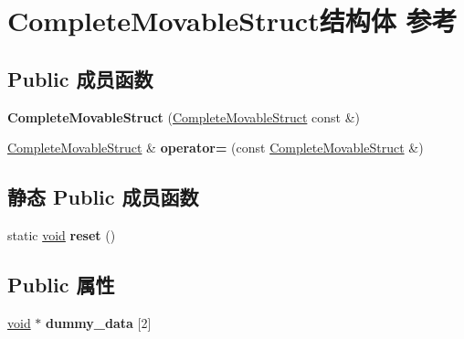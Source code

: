 \hypertarget{struct_complete_movable_struct}{}\section{Complete\+Movable\+Struct结构体 参考}
\label{struct_complete_movable_struct}
\subsection*{Public 成员函数}
\begin{DoxyCompactItemize}
\item 
\mbox{\label{struct_complete_movable_struct_a465ecf80fa25038c7a18110aec8fee29}} 
{\bfseries Complete\+Movable\+Struct} (\hyperlink{struct_complete_movable_struct}{Complete\+Movable\+Struct} const \&)
\item 
\mbox{\label{struct_complete_movable_struct_a7ca0f75057f541d894f9241ab9b9c1d7}} 
\hyperlink{struct_complete_movable_struct}{Complete\+Movable\+Struct} \& {\bfseries operator=} (const \hyperlink{struct_complete_movable_struct}{Complete\+Movable\+Struct} \&)
\end{DoxyCompactItemize}
\subsection*{静态 Public 成员函数}
\begin{DoxyCompactItemize}
\item 
\mbox{\label{struct_complete_movable_struct_a380874d9ac22d2fba24b13d43a73c96f}} 
static \hyperlink{interfacevoid}{void} {\bfseries reset} ()
\end{DoxyCompactItemize}
\subsection*{Public 属性}
\begin{DoxyCompactItemize}
\item 
\mbox{\label{struct_complete_movable_struct_a0dfb1197288f200054d56a4784b2476a}} 
\hyperlink{interfacevoid}{void} $\ast$ {\bfseries dummy\+\_\+data} \mbox{[}2\mbox{]}
\end{DoxyCompactItemize}
